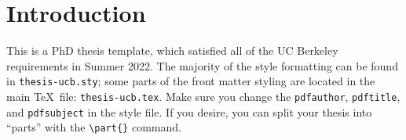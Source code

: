 


%
%

\chapter{Introduction} \label{chap_intro}

This is a PhD thesis template, which satisfied all of the UC Berkeley requirements in Summer 2022.
The majority of the style formatting can be found in \texttt{thesis-ucb.sty}; some parts of the front matter styling are located in the main \TeX\ file: \texttt{thesis-ucb.tex}.
Make sure you change the \texttt{pdfauthor}, \texttt{pdftitle}, and \texttt{pdfsubject} in the style file.
If you desire, you can split your thesis into ``parts'' with the \verb+\part{}+ command.



